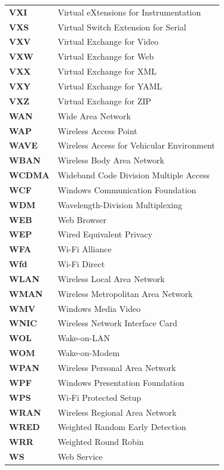 \begin{longtable}{p{3cm}p{11cm}}
\textbf{VXI} & Virtual eXtensions for Instrumentation \\
\textbf{VXS} & Virtual Switch Extension for Serial \\
\textbf{VXV} & Virtual Exchange for Video \\
\textbf{VXW} & Virtual Exchange for Web \\
\textbf{VXX} & Virtual Exchange for XML \\
\textbf{VXY} & Virtual Exchange for YAML \\
\textbf{VXZ} & Virtual Exchange for ZIP \\
\textbf{WAN} & Wide Area Network \\
\textbf{WAP} & Wireless Access Point \\
\textbf{WAVE} & Wireless Access for Vehicular Environment \\
\textbf{WBAN} & Wireless Body Area Network \\
\textbf{WCDMA} & Wideband Code Division Multiple Access \\
\textbf{WCF} & Windows Communication Foundation \\
\textbf{WDM} & Wavelength-Division Multiplexing \\
\textbf{WEB} & Web Browser \\
\textbf{WEP} & Wired Equivalent Privacy \\
\textbf{WFA} & Wi-Fi Alliance \\
\textbf{Wfd} & Wi-Fi Direct \\
\textbf{WLAN} & Wireless Local Area Network \\
\textbf{WMAN} & Wireless Metropolitan Area Network \\
\textbf{WMV} & Windows Media Video \\
\textbf{WNIC} & Wireless Network Interface Card \\
\textbf{WOL} & Wake-on-LAN \\
\textbf{WOM} & Wake-on-Modem \\
\textbf{WPAN} & Wireless Personal Area Network \\
\textbf{WPF} & Windows Presentation Foundation \\
\textbf{WPS} & Wi-Fi Protected Setup \\
\textbf{WRAN} & Wireless Regional Area Network \\
\textbf{WRED} & Weighted Random Early Detection \\
\textbf{WRR} & Weighted Round Robin \\
\textbf{WS} & Web Service \\

\end{longtable}
